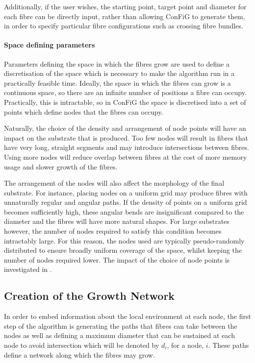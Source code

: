 Additionally, if the user wishes, the starting point, target point and diameter for each fibre can be directly input, rather than allowing ConFiG to generate them, in order to specify particular fibre configurations such as crossing fibre bundles.

\paragraph*{Space defining parameters}
Parameters defining the space in which the fibres grow are used to define a discretisation of the space which is necessary to make the algorithm run in a practically feasible time.
Ideally, the space in which the fibres can grow is a continuous space, so there are an infinite number of positions a fibre can occupy. Practically, this is intractable, so in ConFiG the space is discretised into a set of points which define nodes that the fibres can occupy.

Naturally, the choice of the density and arrangement of node points will have an impact on the substrate that is produced. Too few nodes will result in fibres that have very long, straight segments and may introduce intersections between fibres. Using more nodes will reduce overlap between fibres at the cost of more memory usage and slower growth of the fibres.

The arrangement of the nodes will also affect the morphology of the final substrate. For instance, placing nodes on a uniform grid may produce fibres with unnaturally regular and angular paths. If the density of points on a uniform grid becomes sufficiently high, these angular bends are insignificant compared to the diameter and the fibres will have more natural shapes. For large substrates however, the number of nodes required to satisfy this condition becomes intractably large. For this reason, the nodes used are typically pseudo-randomly distributed to ensure broadly uniform coverage of the space, whilst keeping the number of nodes required lower. 
The impact of the choice of node points is investigated in .

\subsection{Creation of the Growth Network}
\label{sec:creation_of_the_growth_network}
In order to embed information about the local environment at each node, the first step of the algorithm is generating the paths that fibres can take between the nodes as well as defining a maximum diameter that can be sustained at each node to avoid intersection which will be denoted by $d_i$, for a node, $i$. These paths define a network along which the fibres may grow.

